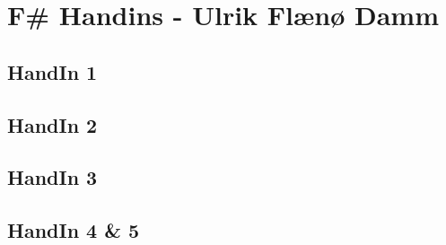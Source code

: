 \section{F\# Handins - Ulrik Flænø Damm}
\label{Appendix_FSharp_Ulrik}

\subsection{HandIn 1}
\label{Appendix_FSharp_Ulrik_1}
\subsection{HandIn 2}
\label{Appendix_FSharp_Ulrik_2}
\subsection{HandIn 3}
\label{Appendix_FSharp_Ulrik_3}
\subsection{HandIn 4 \& 5}
\label{Appendix_FSharp_Ulrik_4and5}